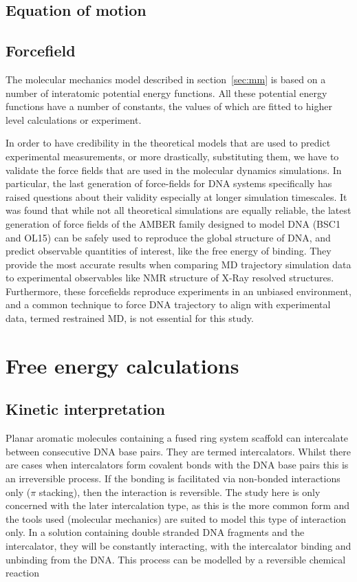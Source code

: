 \documentclass{report}
\begin{document}
\subsection{Equation of motion}

\subsection{Forcefield}

The molecular mechanics model described in section~\ref{sec:mm} is based on a number of interatomic potential energy functions. All these potential energy functions have a number of constants, the values of which are fitted to higher level calculations or experiment.

In order to have credibility in the theoretical models that are used to predict experimental measurements, or more drastically, substituting them, we have to validate the force fields that are used in the molecular dynamics simulations. In particular, the last generation of force-fields for DNA systems specifically has raised questions about their validity especially at longer simulation timescales. It was found that while not all theoretical simulations are equally reliable, the latest generation of force fields of the AMBER family designed to model DNA (BSC1 and OL15) can be safely used to reproduce the global structure of DNA, and predict observable quantities of interest, like the free energy of binding. They provide the most accurate results when comparing MD trajectory simulation data to experimental observables like NMR structure of X-Ray resolved structures. Furthermore, these forcefields reproduce experiments in an unbiased environment, and a common technique to force DNA trajectory to align with experimental data, termed restrained MD, is not essential for this study.





\section{Free energy calculations}

\subsection{Kinetic interpretation}

Planar aromatic molecules containing a fused ring system scaffold can intercalate between consecutive DNA base pairs. They are termed intercalators. Whilst there are cases when intercalators form covalent bonds with the DNA base pairs this is an irreversible process. If the bonding is facilitated via non-bonded interactions only ($\pi$ stacking), then the interaction is reversible. The study here is only concerned with the later intercalation type, as this is the more common form and the tools used (molecular mechanics) are suited to model this type of interaction only. In a solution containing double stranded DNA fragments and the intercalator, they will be constantly interacting, with the intercalator binding and unbinding from the DNA. This process can be modelled by a reversible chemical reaction
\end{document}
